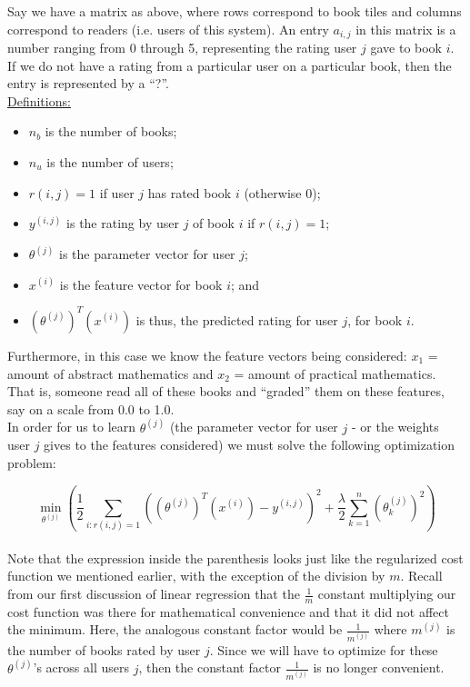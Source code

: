 \documentclass[11pt,a4paper,oneside]{report}
\begin{document}
Say we have a matrix as above, where rows correspond to book tiles and columns correspond to readers (i.e. users of this system). An entry $a_{i,j}$ in this matrix is a number ranging from 0 through 5, representing the rating user $j$ gave to book $i$. If we do not have a rating from a particular user on a particular book, then the entry is represented by a ``?''. \\

\underline{Definitions:}
\begin{itemize}
\item $n_b$ is the number of books;
\item $n_u$ is the number of users;
\item $r(i,j) = 1$ if user $j$ has rated book $i$ (otherwise 0);
\item $y^{(i,j)}$ is the rating by user $j$ of book $i$ if $r(i,j) = 1$;
\item $\theta^{(j)}$ is the parameter vector for user $j$;
\item $x^{(i)}$ is the feature vector for book $i$; and 
\item $(\theta^{(j)})^T(x^{(i)})$ is thus, the predicted rating for user $j$, for book $i$.\\
\end{itemize}

Furthermore, in this case we know the feature vectors being considered: $x_1$ = amount of abstract mathematics and $x_2$ = amount of practical mathematics. That is, someone read all of these books and ``graded'' them on these features, say on a scale from 0.0 to 1.0. \\

In order for us to learn $\theta^{(j)}$ (the parameter vector for user $j$ - or the weights user $j$ gives to the features considered) we must solve the following optimization problem:

\[
\boxed{\min_{\theta^{(j)}} \left(\frac{1}{2} \sum_{i:r(i,j)=1}((\theta^{(j)})^T(x^{(i)}) - y^{(i,j)})^2 + \frac{\lambda}{2}\sum_{k=1}^n(\theta^{(j)}_k)^2\right)}
\]\\

Note that the expression inside the parenthesis looks just like the regularized cost function we mentioned earlier, with the exception of the division by $m$. Recall from our first discussion of linear regression that the $\frac{1}{m}$ constant multiplying our cost function was there for mathematical convenience and that it did not affect the minimum. Here, the analogous constant factor would be $\frac{1}{m^{(j)}}$ where $m^{(j)}$ is the number of books rated by user $j$. Since we will have to optimize for these $\theta^{(j)}$'s across all users $j$, then the constant factor $\frac{1}{m^{(j)}}$ is no longer convenient.\\
\end{document}
